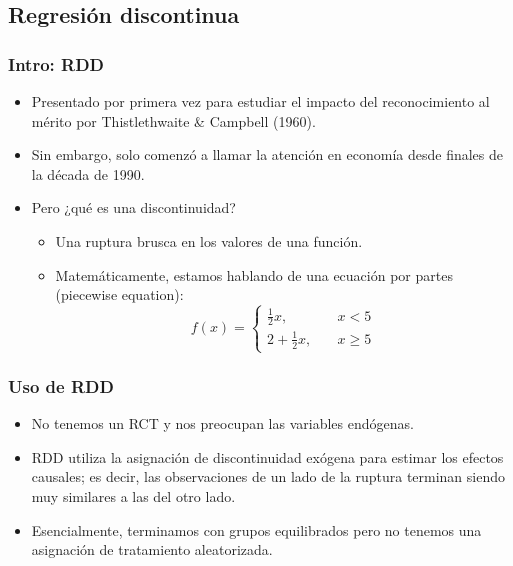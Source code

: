 \documentclass[10pt, aspectratio=169, compress]{beamer}
\begin{document}
\subsection{Regresión discontinua}
\begin{frame}
	\frametitle{Intro: RDD}

	\begin{itemize}
		\item Presentado por primera vez para estudiar el impacto del reconocimiento al mérito por Thistlethwaite \& Campbell (1960).
		\item Sin embargo, solo comenzó a llamar la atención en economía desde finales de la década de 1990.
		\item Pero ¿qué es una discontinuidad?
		\begin{itemize}
			\item Una ruptura brusca en los valores de una función.
			\item Matemáticamente, estamos hablando de una ecuación por partes (piecewise equation):
			$$
			f(x) = \left\{
			\begin{array}{ll}
			\frac{1}{2} x, 	& \quad x < 5 \\
			2+\frac{1}{2}x,  & \quad x \geq 5
			\end{array}
			\right.
			$$
		\end{itemize}
	\end{itemize}
\end{frame}
\begin{frame}
	\frametitle{Uso de RDD}

	\begin{itemize}
		\item No tenemos un RCT y nos preocupan las variables endógenas.
		\item RDD utiliza la asignación de discontinuidad exógena para estimar los efectos causales; es decir, las observaciones de un lado de la ruptura terminan siendo muy similares a las del otro lado.
		\item Esencialmente, terminamos con grupos equilibrados pero no tenemos una asignación de tratamiento aleatorizada.
	\end{itemize}

\end{frame}
\end{document}
